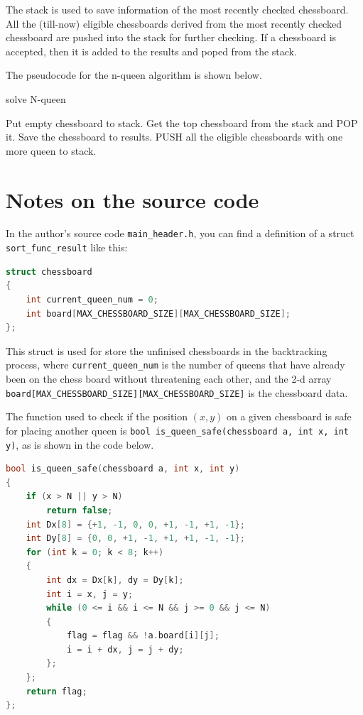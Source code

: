 \documentclass[cn,black,12pt,normal]{elegantnote}
\begin{document}
The stack is used to save information of the most recently checked chessboard. All the (till-now) eligible chessboards derived from the most recently checked chessboard are pushed into the stack for further checking. If a chessboard is accepted, then it is added to the results and poped from the stack.

The pseudocode for the n-queen algorithm is shown below.
\begin{algorithm}[H]
    \caption{solve N-queen}
    \label{alg2}
    \begin{algorithmic}
        \STATE Put empty chessboard to stack.
        \STATE Get the top chessboard from the stack and POP it.
        \STATE Save the chessboard to results.
        \ELSE
        \STATE PUSH all the eligible chessboards with one more queen to stack.
        \ENDIF
        \ENDWHILE
    \end{algorithmic}
\end{algorithm}

\section{Notes on the source code}

In the author's source code \lstinline{main_header.h}, you can find a definition of a struct \lstinline{sort_func_result} like this:
\begin{lstlisting}[language = C++]
struct chessboard
{
	int current_queen_num = 0;
	int board[MAX_CHESSBOARD_SIZE][MAX_CHESSBOARD_SIZE];
};
\end{lstlisting}
This struct is used for store the unfinised chessboards in the backtracking process, where \lstinline{current_queen_num} is the number of queens that have already been on the chess board without threatening each other, and the 2-d array \lstinline{board[MAX_CHESSBOARD_SIZE][MAX_CHESSBOARD_SIZE]} is the chessboard data.

The function used to check if the position $(x,y)$ on a given chessboard is safe for placing another queen is \lstinline{bool is_queen_safe(chessboard a, int x, int y)}, as is shown in the code below.
\begin{lstlisting}[language = C++]
bool is_queen_safe(chessboard a, int x, int y)
{
	if (x > N || y > N)
		return false;
	int Dx[8] = {+1, -1, 0, 0, +1, -1, +1, -1};
	int Dy[8] = {0, 0, +1, -1, +1, +1, -1, -1};
	for (int k = 0; k < 8; k++)
	{
		int dx = Dx[k], dy = Dy[k];
		int i = x, j = y;
		while (0 <= i && i <= N && j >= 0 && j <= N)
		{
			flag = flag && !a.board[i][j];
			i = i + dx, j = j + dy;
		};
	};
	return flag;
};
\end{lstlisting}
\end{document}
